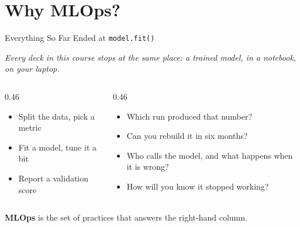 \section{Why MLOps?}

\begin{frame}{Everything So Far Ended at \texttt{model.fit()}}

    \centering
    \large
    \textit{Every deck in this course stops at the same place: a trained model, in a notebook, on your laptop.}

    \vspace{0.36em}

    \begin{columns}[T]
        \begin{column}{0.46\textwidth}
            \begin{tcolorbox}[colback=blue!5, colframe=blue!50, title=What we have taught you]
                \scriptsize
                \begin{itemize}
                    \item Split the data, pick a metric
                    \item Fit a model, tune it a bit
                    \item Report a validation score
                \end{itemize}
            \end{tcolorbox}
        \end{column}
        \begin{column}{0.46\textwidth}
            \begin{tcolorbox}[colback=red!5, colframe=red!50, title=What nobody taught you]
                \scriptsize
                \begin{itemize}
                    \item Which run produced that number?
                    \item Can you rebuild it in six months?
                    \item Who calls the model, and what happens when it is wrong?
                    \item How will you know it stopped working?
                \end{itemize}
            \end{tcolorbox}
        \end{column}
    \end{columns}

    \vspace{0.3em}
    \scriptsize
    \textbf{MLOps} is the set of practices that answers the right-hand column.

\end{frame}
